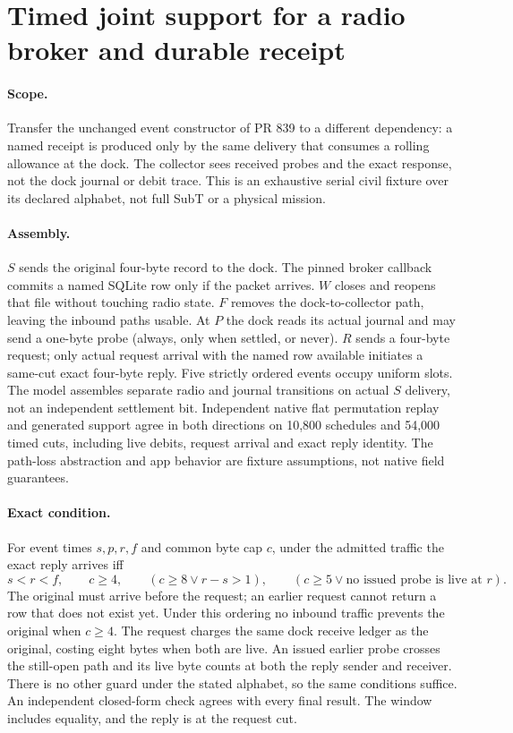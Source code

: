 \documentclass{article}
\begin{document}
\section*{Timed joint support for a radio broker and durable receipt}
\paragraph{Scope.} Transfer the unchanged event constructor of PR 839
to a different dependency: a named receipt is produced only by the
same delivery that consumes a rolling allowance at the dock.
The collector sees received probes and the exact response, not the dock
journal or debit trace. This is an exhaustive serial civil fixture
over its declared alphabet, not full SubT or a physical mission.

\paragraph{Assembly.} \(S\) sends the original four-byte record to the
dock. The pinned broker callback commits a named SQLite row only if the
packet arrives. \(W\) closes and reopens that file without touching radio
state. \(F\) removes the dock-to-collector path, leaving the inbound
paths usable. At \(P\) the dock reads its actual journal and may send
a one-byte probe (always, only when settled, or never). \(R\) sends a
four-byte request; only actual request arrival with the named row
available initiates a same-cut exact four-byte reply. Five strictly
ordered events occupy uniform slots. The model assembles separate
radio and journal transitions on actual \(S\) delivery, not an
independent settlement bit. Independent native flat permutation
replay and generated support agree in both directions on 10,800
schedules and 54,000 timed cuts, including live debits, request arrival
and exact reply identity. The path-loss abstraction and app behavior
are fixture assumptions, not native field guarantees.

\paragraph{Exact condition.}
For event times \(s,p,r,f\) and common byte cap \(c\), under the admitted
traffic the exact reply arrives iff
\[
s<r<f,\qquad c\ge4,\qquad
(c\ge8\lor r-s>1),\qquad
(c\ge5\lor \text{no issued probe is live at }r).
\]
The original must arrive before the request; an earlier request cannot
return a row that does not exist yet. Under this ordering no inbound
traffic prevents the original when \(c\ge4\). The request charges the
same dock receive ledger as the original, costing eight bytes when
both are live. An issued earlier probe crosses the still-open path
and its live byte counts at both the reply sender and receiver.
There is no other guard under the stated alphabet, so the same
conditions suffice. An independent closed-form check agrees with every
final result. The window includes equality, and the reply is at the
request cut.
\end{document}
